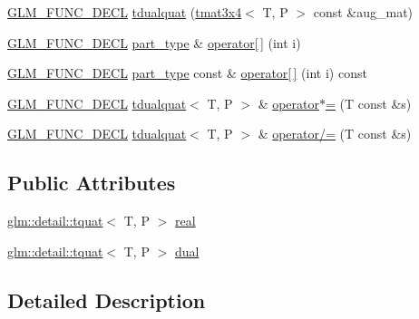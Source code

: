 \begin{DoxyCompactItemize}
\hyperlink{setup_8hpp_ab2d052de21a70539923e9bcbf6e83a51}{G\+L\+M\+\_\+\+F\+U\+N\+C\+\_\+\+D\+E\+CL} \hyperlink{structglm_1_1detail_1_1tdualquat_afd1ddf2aeffe1f900dfbc17507860e89}{tdualquat} (\hyperlink{structglm_1_1detail_1_1tmat3x4}{tmat3x4}$<$ T, P $>$ const \&aug\+\_\+mat)
\item 
\hyperlink{setup_8hpp_ab2d052de21a70539923e9bcbf6e83a51}{G\+L\+M\+\_\+\+F\+U\+N\+C\+\_\+\+D\+E\+CL} \hyperlink{structglm_1_1detail_1_1tdualquat_a811e451c41fec5277ac7c99381152df4}{part\+\_\+type} \& \hyperlink{structglm_1_1detail_1_1tdualquat_a6c97baca66efdfefa2e127d4868ce22c}{operator\mbox{[}$\,$\mbox{]}} (int i)
\item 
\hyperlink{setup_8hpp_ab2d052de21a70539923e9bcbf6e83a51}{G\+L\+M\+\_\+\+F\+U\+N\+C\+\_\+\+D\+E\+CL} \hyperlink{structglm_1_1detail_1_1tdualquat_a811e451c41fec5277ac7c99381152df4}{part\+\_\+type} const  \& \hyperlink{structglm_1_1detail_1_1tdualquat_a4cfed656116c4a21c321832ce3ea0a74}{operator\mbox{[}$\,$\mbox{]}} (int i) const
\item 
\hyperlink{setup_8hpp_ab2d052de21a70539923e9bcbf6e83a51}{G\+L\+M\+\_\+\+F\+U\+N\+C\+\_\+\+D\+E\+CL} \hyperlink{structglm_1_1detail_1_1tdualquat}{tdualquat}$<$ T, P $>$ \& \hyperlink{structglm_1_1detail_1_1tdualquat_ab958553d52f05997218dc32ff66308ff}{operator$\ast$=} (T const \&s)
\item 
\hyperlink{setup_8hpp_ab2d052de21a70539923e9bcbf6e83a51}{G\+L\+M\+\_\+\+F\+U\+N\+C\+\_\+\+D\+E\+CL} \hyperlink{structglm_1_1detail_1_1tdualquat}{tdualquat}$<$ T, P $>$ \& \hyperlink{structglm_1_1detail_1_1tdualquat_a16b0b3f78c28d7cf982761d66dada98d}{operator/=} (T const \&s)
\end{DoxyCompactItemize}
\subsection*{Public Attributes}
\begin{DoxyCompactItemize}
\item 
\hyperlink{structglm_1_1detail_1_1tquat}{glm\+::detail\+::tquat}$<$ T, P $>$ \hyperlink{structglm_1_1detail_1_1tdualquat_abebb177d1dca2b170fe7d01e9970eb37}{real}
\item 
\hyperlink{structglm_1_1detail_1_1tquat}{glm\+::detail\+::tquat}$<$ T, P $>$ \hyperlink{structglm_1_1detail_1_1tdualquat_a6d739e4771a6244cc15562c2ecda7fdc}{dual}
\end{DoxyCompactItemize}


\subsection{Detailed Description}
